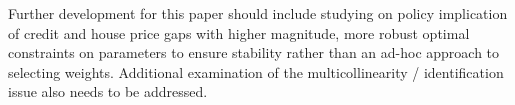 \documentclass[12pt]{article}
\begin{document}
\begin{outline}[enumerate]
		Further development for this paper should include studying on policy implication of credit and house price gaps with higher magnitude, more robust optimal constraints on parameters to ensure stability rather than an ad-hoc approach to selecting weights. Additional examination of the multicollinearity / identification issue also needs to be addressed.
		
		
				
%
		
		\clearpage
		
		
		


\end{outline}
\end{document}
